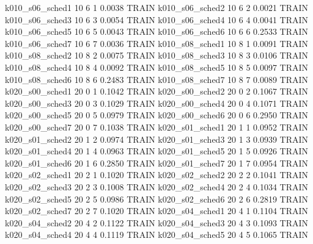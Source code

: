   k010_s06_sched1                   10    6   1    0.0038  TRAIN
  k010_s06_sched2                   10    6   2    0.0021  TRAIN
  k010_s06_sched3                   10    6   3    0.0054  TRAIN
  k010_s06_sched4                   10    6   4    0.0041  TRAIN
  k010_s06_sched5                   10    6   5    0.0043  TRAIN
  k010_s06_sched6                   10    6   6    0.2533  TRAIN
  k010_s06_sched7                   10    6   7    0.0036  TRAIN
  k010_s08_sched1                   10    8   1    0.0091  TRAIN
  k010_s08_sched2                   10    8   2    0.0075  TRAIN
  k010_s08_sched3                   10    8   3    0.0106  TRAIN
  k010_s08_sched4                   10    8   4    0.0092  TRAIN
  k010_s08_sched5                   10    8   5    0.0097  TRAIN
  k010_s08_sched6                   10    8   6    0.2483  TRAIN
  k010_s08_sched7                   10    8   7    0.0089  TRAIN
  k020_s00_sched1                   20    0   1    0.1042  TRAIN
  k020_s00_sched2                   20    0   2    0.1067  TRAIN
  k020_s00_sched3                   20    0   3    0.1029  TRAIN
  k020_s00_sched4                   20    0   4    0.1071  TRAIN
  k020_s00_sched5                   20    0   5    0.0979  TRAIN
  k020_s00_sched6                   20    0   6    0.2950  TRAIN
  k020_s00_sched7                   20    0   7    0.1038  TRAIN
  k020_s01_sched1                   20    1   1    0.0952  TRAIN
  k020_s01_sched2                   20    1   2    0.0974  TRAIN
  k020_s01_sched3                   20    1   3    0.0939  TRAIN
  k020_s01_sched4                   20    1   4    0.0963  TRAIN
  k020_s01_sched5                   20    1   5    0.0926  TRAIN
  k020_s01_sched6                   20    1   6    0.2850  TRAIN
  k020_s01_sched7                   20    1   7    0.0954  TRAIN
  k020_s02_sched1                   20    2   1    0.1020  TRAIN
  k020_s02_sched2                   20    2   2    0.1041  TRAIN
  k020_s02_sched3                   20    2   3    0.1008  TRAIN
  k020_s02_sched4                   20    2   4    0.1034  TRAIN
  k020_s02_sched5                   20    2   5    0.0986  TRAIN
  k020_s02_sched6                   20    2   6    0.2819  TRAIN
  k020_s02_sched7                   20    2   7    0.1020  TRAIN
  k020_s04_sched1                   20    4   1    0.1104  TRAIN
  k020_s04_sched2                   20    4   2    0.1122  TRAIN
  k020_s04_sched3                   20    4   3    0.1093  TRAIN
  k020_s04_sched4                   20    4   4    0.1119  TRAIN
  k020_s04_sched5                   20    4   5    0.1065  TRAIN
